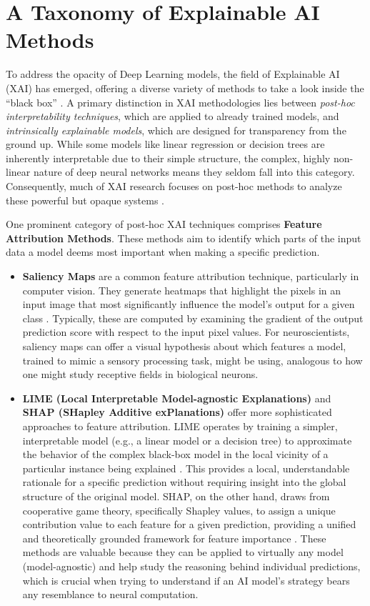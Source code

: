 \section{A Taxonomy of Explainable AI Methods}\label{sec:XAI-tax}

To address the opacity of Deep Learning models, the field of Explainable AI (XAI) has emerged, offering a diverse variety of methods to take a look inside the ``black box'' \cite{doshi2017towards, miller2019explanation}. A primary distinction in XAI methodologies lies between \textit{post-hoc interpretability techniques}, which are applied to already trained models, and \textit{intrinsically explainable models}, which are designed for transparency from the ground up. While some models like linear regression or decision trees are inherently interpretable due to their simple structure, the complex, highly non-linear nature of deep neural networks means they seldom fall into this category. Consequently, much of XAI research focuses on post-hoc methods to analyze these powerful but opaque systems \cite{doshi2017towards}.

One prominent category of post-hoc XAI techniques comprises \textbf{Feature Attribution Methods}. These methods aim to identify which parts of the input data a model deems most important when making a specific prediction.
\begin{itemize}
    \item \textbf{Saliency Maps} are a common feature attribution technique, particularly in computer vision. They generate heatmaps that highlight the pixels in an input image that most significantly influence the model's output for a given class \cite{fong2017interpretable}. Typically, these are computed by examining the gradient of the output prediction score with respect to the input pixel values. For neuroscientists, saliency maps can offer a visual hypothesis about which features a model, trained to mimic a sensory processing task, might be using, analogous to how one might study receptive fields in biological neurons.
    \item \textbf{LIME (Local Interpretable Model-agnostic Explanations)} and \textbf{SHAP (SHapley Additive exPlanations)} offer more sophisticated approaches to feature attribution. LIME operates by training a simpler, interpretable model (e.g., a linear model or a decision tree) to approximate the behavior of the complex black-box model in the local vicinity of a particular instance being explained \cite{ribeiro2016why}. This provides a local, understandable rationale for a specific prediction without requiring insight into the global structure of the original model. SHAP, on the other hand, draws from cooperative game theory, specifically Shapley values, to assign a unique contribution value to each feature for a given prediction, providing a unified and theoretically grounded framework for feature importance \cite{lundberg2017unified}. These methods are valuable because they can be applied to virtually any model (model-agnostic) and help study the reasoning behind individual predictions, which is crucial when trying to understand if an AI model's strategy bears any resemblance to neural computation.
\end{itemize}

